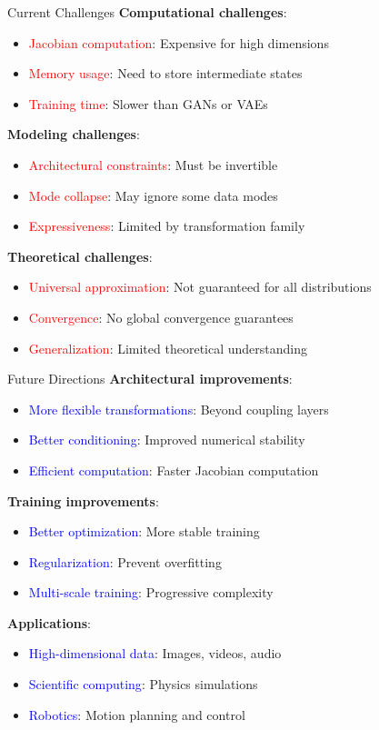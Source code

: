 \documentclass[aspectratio=169]{beamer}
\begin{document}
\begin{frame}{Current Challenges}
\textbf{Computational challenges}:
\begin{itemize}
    \item \textcolor{red}{Jacobian computation}: Expensive for high dimensions
    \item \textcolor{red}{Memory usage}: Need to store intermediate states
    \item \textcolor{red}{Training time}: Slower than GANs or VAEs
\end{itemize}

\textbf{Modeling challenges}:
\begin{itemize}
    \item \textcolor{red}{Architectural constraints}: Must be invertible
    \item \textcolor{red}{Mode collapse}: May ignore some data modes
    \item \textcolor{red}{Expressiveness}: Limited by transformation family
\end{itemize}

\textbf{Theoretical challenges}:
\begin{itemize}
    \item \textcolor{red}{Universal approximation}: Not guaranteed for all distributions
    \item \textcolor{red}{Convergence}: No global convergence guarantees
    \item \textcolor{red}{Generalization}: Limited theoretical understanding
\end{itemize}
\end{frame}

\begin{frame}{Future Directions}
\textbf{Architectural improvements}:
\begin{itemize}
    \item \textcolor{blue}{More flexible transformations}: Beyond coupling layers
    \item \textcolor{blue}{Better conditioning}: Improved numerical stability
    \item \textcolor{blue}{Efficient computation}: Faster Jacobian computation
\end{itemize}

\textbf{Training improvements}:
\begin{itemize}
    \item \textcolor{blue}{Better optimization}: More stable training
    \item \textcolor{blue}{Regularization}: Prevent overfitting
    \item \textcolor{blue}{Multi-scale training}: Progressive complexity
\end{itemize}

\textbf{Applications}:
\begin{itemize}
    \item \textcolor{blue}{High-dimensional data}: Images, videos, audio
    \item \textcolor{blue}{Scientific computing}: Physics simulations
    \item \textcolor{blue}{Robotics}: Motion planning and control
\end{itemize}
\end{frame}
\end{document}
